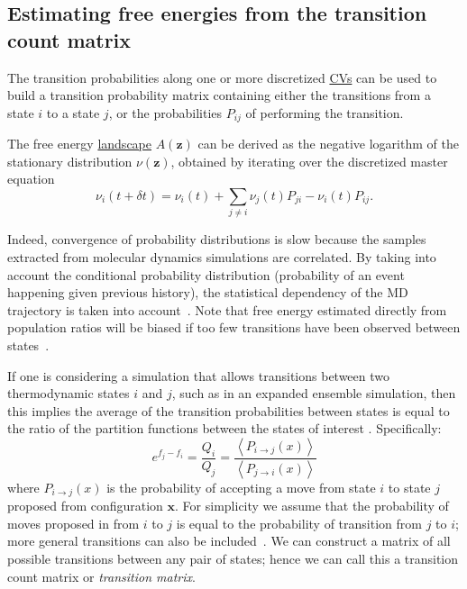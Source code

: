 \documentclass[9pt,review]{livecoms}
\newcommand{\vx}{\mathbf{x}}
\newcommand{\vz}{\mathbf{z}}
\begin{document}
\subsection{Estimating free energies from the transition count matrix\label{sec:transtion_matrix}}

The transition probabilities along one or more discretized \hyperlink{ref:CV} {CVs} can be used to build a transition probability matrix containing either the transitions from a state $i$ to a state $j$, or the probabilities $P_{ij}$ of performing the transition.

The free energy \hyperlink{ref:FES} {landscape} $A(\vz)$ can be derived as the negative logarithm of the stationary distribution $\nu(\vz)$, obtained by iterating over the discretized master equation
\begin{equation}
   \nu_i(t + \delta t) = \nu_i(t) + \sum_{j \neq i} \nu_j(t) P_{ji} - \nu_i(t) P_{ij}.
\end{equation}

Indeed, convergence of probability distributions is slow because the samples extracted from molecular dynamics simulations are correlated. By taking into account the conditional probability distribution (probability of an event happening given previous history), the statistical dependency of the MD trajectory is taken into account~\cite{No2007,Zhu2011,Rosta2014}. Note that free energy estimated directly from population ratios will be biased if too few transitions have been observed between states~\cite{No2009}.

If one is considering a simulation that allows transitions between two thermodynamic states $i$ and $j$, such as in an expanded ensemble simulation, then this implies the average of the transition probabilities between states is equal to the ratio of the partition functions between the states of interest \cite{deOliveira:EPJB:1998,Wang:JoSP:2002,escobedo_transition_2006}. Specifically:
\begin{equation}
e^{f_j-f_i} = \frac{Q_i}{Q_j} = \frac{\left \langle  P_{i\rightarrow j}(x)\right\rangle}{\left \langle P_{j\rightarrow i}(x) \right \rangle} 
\end{equation}
where $P_{i\rightarrow j}(x)$ is the probability of accepting a move from state $i$ to state $j$ proposed from configuration $\vx$. For simplicity we assume that the probability of moves proposed in from $i$ to $j$ is equal to the probability of transition from $j$ to $i$; more general transitions can also be included~\cite{escobedo_transition_2006}. We can construct a matrix of all possible transitions between any pair of states; hence we can call this a transition count matrix or \textit{transition matrix}.
\end{document}
